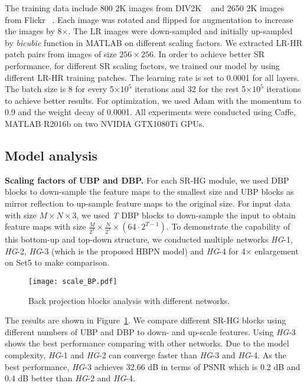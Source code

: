 \documentclass[10pt,twocolumn,letterpaper]{article}
\begin{document}
The training data include 800 2K images from DIV2K ~\cite{NTIRE} and 2650 2K images from Flickr ~\cite{EDSR}. Each image was rotated and flipped for augmentation to increase the images by 8$\times$. The LR images were down-sampled and initially up-sampled by \textit{bicubic} function in MATLAB on different scaling factors. We extracted LR-HR patch pairs from images of size $256\times256$. In order to achieve better SR performance, for different SR scaling factors, we trained our model by using different LR-HR training patches. The learning rate is set to 0.0001 for all layers. The batch size is 8 for every 5$\times10^5$ iterations and 32 for the rest 5$\times10^5$ iterations to achieve better results. For optimization, we used Adam with the momentum to 0.9 and the weight decay of 0.0001. All experiments were conducted using Caffe, MATLAB R2016b on two NVIDIA GTX1080Ti GPUs.



\subsection{Model analysis}
\textbf{Scaling factors of UBP and DBP.} For each SR-HG module, we used DBP blocks to down-sample the feature maps to the smallest size and UBP blocks as mirror reflection to up-sample feature maps to the original size. For input data with size $\mathit{M}\times \mathit{N}\times 3$, we used \textit{T} DBP blocks to down-sample the input to obtain feature maps with size $\frac{\mathit{M}}{2^{\mathit{T}}}\times \frac{\mathit{N}}{2^{\mathit{T}}}\times (64\cdot2^{\mathit{T}-1})$. To demonstrate the capability of this bottom-up and top-down structure, we conducted multiple networks \textit{HG}-1, \textit{HG}-2, \textit{HG}-3 (which is the proposed HBPN model) and \textit{HG}-4 for 4$\times$ enlargement on Set5 to make comparison.

\begin{figure}[h]
\vskip 0.01in
\begin{center}
\centerline{\texttt{[image: scale\_BP.pdf]}}
\caption{Back projection blocks analysis with different networks.}
\label{Figure 6}
\end{center}
\vskip -0.3in
\end{figure}

The results are shown in Figure~\ref{Figure 6}. We compare different SR-HG blocks using different numbers of UBP and DBP to down- and up-scale features. Using \textit{HG}-3 shows the best performance comparing with other networks. Due to the model complexity, \textit{HG}-1 and \textit{HG}-2 can converge faster than \textit{HG}-3 and \textit{HG}-4. As the best performance, \textit{HG}-3 achieves 32.66 dB in terms of PSNR which is 0.2 dB and 0.4 dB better than \textit{HG}-2 and \textit{HG}-4. 
\end{document}
